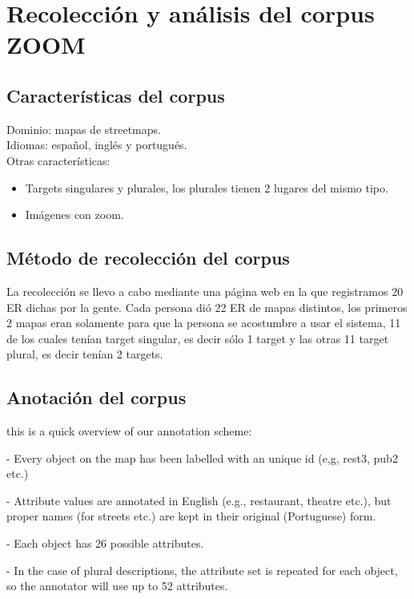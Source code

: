 \chapter{Recolecci\'on y an\'alisis del corpus ZOOM}
\label{sec:corpus}

\section{Caracter\'{i}sticas del corpus}

Dominio: mapas de streetmaps.\\
Idiomas: espa\~nol, ingl\'es y portugu\'es.\\

Otras caracter\'{i}sticas: 
\begin{itemize}

\item Targets singulares y plurales, los plurales tienen 2 lugares del mismo tipo.
\item Im\'agenes con zoom.

\end{itemize}

\section{M\'etodo de recolecci\'on del corpus}

La recolecci\'on se llevo a cabo mediante una p\'agina web en la que registramos 20 ER dichas por la gente. Cada persona di\'o 22 ER de mapas distintos, los primeros 2 mapas eran solamente para que la persona se acostumbre a usar el sistema, 11 de los cuales ten\'{i}an target singular, es decir s\'olo 1 target y las otras 11 target plural, es decir ten\'{i}an 2 targets.


\section{Anotaci\'on del corpus}

this is a quick overview of our annotation scheme:

- Every object on the map has been labelled with an unique id (e,g, rest3, pub2 etc.)

- Attribute values are annotated in English (e.g., restaurant, theatre etc.), but proper names (for streets etc.) are kept in their original (Portuguese) form.

- Each object has 26 possible attributes. 

- In the case of plural descriptions, the attribute set is repeated for each object, so the annotator will use up to 52 attributes.

